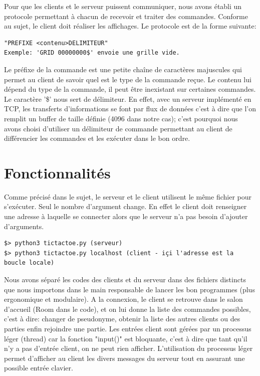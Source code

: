 \documentclass[a4paper]{article}
\begin{document}
Pour que les clients et le serveur puissent communiquer, nous avons établi un protocole permettant à chacun de recevoir et traiter des commandes. Conforme au sujet, le client doit réaliser les affichages. Le protocole est de la forme suivante:
\begin{verbatim}
"PREFIXE <contenu>DELIMITEUR"
Exemple: 'GRID 00000000$' envoie une grille vide.
\end{verbatim}

Le préfixe de la commande est une petite chaîne de caractères majuscules qui permet au client de savoir quel est le type de la commande reçue. Le contenu lui dépend du type de la commande, il peut être inexistant sur certaines commandes.
Le caractère '\$' nous sert de délimiteur. En effet, avec un serveur implémenté en TCP, les transferts d'informations se font par flux de données c'est à dire que l'on remplit un buffer de taille définie (4096 dans notre cas); c'est pourquoi nous avons choisi d'utiliser un délimiteur de commande permettant au client de différencier les commandes et les exécuter dans le bon ordre.

\section{Fonctionnalités}

Comme précisé dans le sujet, le serveur et le client utilisent le même fichier pour s'exécuter. Seul le nombre d'argument change. En effet le client doit renseigner une adresse à laquelle se connecter alors que le serveur n'a pas besoin d'ajouter d'arguments.

\begin{verbatim}
$> python3 tictactoe.py (serveur)
$> python3 tictactoe.py localhost (client - içi l'adresse est la boucle locale)
\end{verbatim}

Nous avons séparé les codes des clients et du serveur dans des fichiers distincts que nous importons dans le main responsable de lancer les bon programmes (plus ergonomique et modulaire).
A la connexion, le client se retrouve dans le salon d'accueil (Room dans le code), et on lui donne la liste des commandes possibles, c'est à dire:
changer de pseudonyme,
obtenir la liste des autres clients ou des parties
enfin rejoindre une partie.
Les entrées client sont gérées par un processus léger (thread) car la fonction "input()" est bloquante, c'est à dire que tant qu'il n'y a pas d'entrée client, on ne peut rien afficher. L'utilisation du processus léger permet d'afficher au client les divers messages du serveur tout en assurant une possible entrée clavier.
\end{document}

